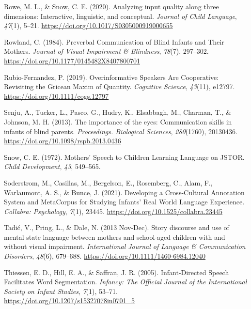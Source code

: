 \documentclass[
  man,floatsintext]{apa6}
\newlength{\cslhangindent}
\newlength{\cslentryspacingunit} %
\newenvironment{CSLReferences}[2] %
 {%
  \setlength{\parindent}{0pt}
  \ifodd #1
  \let\oldpar\par
  \def\par{\hangindent=\cslhangindent\oldpar}
  \fi
  \setlength{\parskip}{#2\cslentryspacingunit}
 }%
 {}
\begin{document}
\begin{CSLReferences}{1}{0}
\leavevmode{}%
Rowe, M. L., \& Snow, C. E. (2020). Analyzing input quality along three dimensions: Interactive, linguistic, and conceptual. \emph{Journal of Child Language}, \emph{47}(1), 5--21. \url{https://doi.org/10.1017/S0305000919000655}

\leavevmode{}%
Rowland, C. (1984). Preverbal {Communication} of {Blind Infants} and {Their Mothers}. \emph{Journal of Visual Impairment \& Blindness}, \emph{78}(7), 297--302. \url{https://doi.org/10.1177/0145482X8407800701}

\leavevmode{}%
Rubio-Fernandez, P. (2019). Overinformative {Speakers Are Cooperative}: {Revisiting} the {Gricean Maxim} of {Quantity}. \emph{Cognitive Science}, \emph{43}(11), e12797. \url{https://doi.org/10.1111/cogs.12797}

\leavevmode{}%
Senju, A., Tucker, L., Pasco, G., Hudry, K., Elsabbagh, M., Charman, T., \& Johnson, M. H. (2013). The importance of the eyes: Communication skills in infants of blind parents. \emph{Proceedings. Biological Sciences}, \emph{280}(1760), 20130436. \url{https://doi.org/10.1098/rspb.2013.0436}

\leavevmode{}%
Snow, C. E. (1972). Mothers' {Speech} to {Children Learning Language} on {JSTOR}. \emph{Child Development}, \emph{43}, 549--565.

\leavevmode{}%
Soderstrom, M., Casillas, M., Bergelson, E., Rosemberg, C., Alam, F., Warlaumont, A. S., \& Bunce, J. (2021). Developing a {Cross-Cultural Annotation System} and {MetaCorpus} for {Studying Infants}' {Real World Language Experience}. \emph{Collabra: Psychology}, \emph{7}(1), 23445. \url{https://doi.org/10.1525/collabra.23445}

\leavevmode{}%
Tadić, V., Pring, L., \& Dale, N. (2013 Nov-Dec). Story discourse and use of mental state language between mothers and school-aged children with and without visual impairment. \emph{International Journal of Language \& Communication Disorders}, \emph{48}(6), 679--688. \url{https://doi.org/10.1111/1460-6984.12040}

\leavevmode{}%
Thiessen, E. D., Hill, E. A., \& Saffran, J. R. (2005). Infant-{Directed Speech Facilitates Word Segmentation}. \emph{Infancy: The Official Journal of the International Society on Infant Studies}, \emph{7}(1), 53--71. \url{https://doi.org/10.1207/s15327078in0701_5}


\end{CSLReferences}
\end{document}
